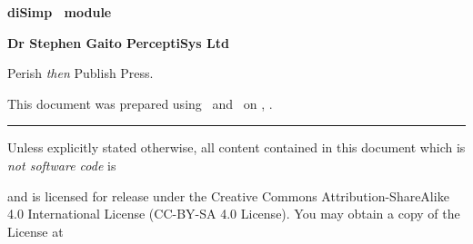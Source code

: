 
\startmakeup

\blank[5cm]
  
\startalignment[center]
\dontleavehmode
\tfd\bf
diSimp \ConTeXt\ module
\stopalignment

\blank[1cm]

\startalignment[center]
\dontleavehmode
\tfc\bf
\stopalignment

\blank[1cm]

\startalignment[center]
\dontleavehmode
\tfb\bf
\stopalignment

\blank[8cm]

\startalignment[flushright]
\dontleavehmode
\tfa\bf
\bTABLE
  \setupTABLE[r][each][frame=off]
  \bTR \bTD Dr Stephen Gaito \eTD \eTR
  \bTR \bTD PerceptiSys Ltd \eTD \eTR
  \bTR \bTD \date \eTD \eTR
\eTABLE
\stopalignment

\blank[5cm]

\startalignment[center]
Perish \emph{then} Publish Press.
\stopalignment

\stopmakeup

\startmakeup

\blank[6cm]



This document was prepared using \ConTeXt\ and \LuaTeX\ on 
\currentdate[month] \currentdate[day], \currentdate[year].


\blank

\hrule
\blank[medium]

Unless explicitly stated otherwise, all content contained in this
document which is \emph{not software code} is

\blank[small]

\startcenteraligned
{}
\stopcenteraligned

\blank[small]

and is licensed for release under the Creative Commons
Attribution-ShareAlike 4.0 International License (CC-BY-SA 4.0 License).
You may obtain a copy of the License at

\blank[small]

\startcenteraligned
{}
\stopcenteraligned

